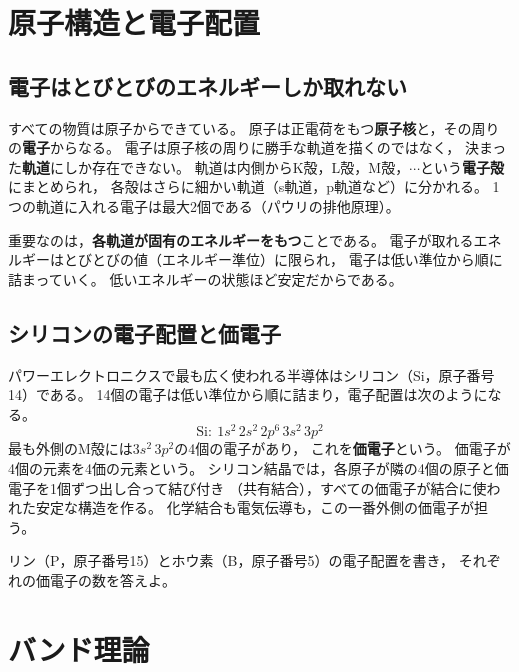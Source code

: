 \section{原子構造と電子配置}
\label{sec1.2}

\subsection{電子はとびとびのエネルギーしか取れない}

すべての物質は原子からできている。
原子は正電荷をもつ\textbf{原子核}と，その周りの\textbf{電子}からなる。
電子は原子核の周りに勝手な軌道を描くのではなく，
決まった\textbf{軌道}にしか存在できない。
軌道は内側からK殻，L殻，M殻，$\cdots$という\textbf{電子殻}にまとめられ，
各殻はさらに細かい軌道（s軌道，p軌道など）に分かれる。
1つの軌道に入れる電子は最大2個である（パウリの排他原理）。

重要なのは，\textbf{各軌道が固有のエネルギーをもつ}ことである。
電子が取れるエネルギーはとびとびの値（エネルギー準位）に限られ，
電子は低い準位から順に詰まっていく。
低いエネルギーの状態ほど安定だからである。

\subsection{シリコンの電子配置と価電子}

パワーエレクトロニクスで最も広く使われる半導体はシリコン（Si，原子番号14）である。
14個の電子は低い準位から順に詰まり，電子配置は次のようになる。
\begin{equation*}
\mathrm{Si:}\ 1s^2\,2s^2\,2p^6\,3s^2\,3p^2
\end{equation*}
最も外側のM殻には$3s^2\,3p^2$の4個の電子があり，
これを\textbf{価電子}という。
価電子が4個の元素を4価の元素という。
シリコン結晶では，各原子が隣の4個の原子と価電子を1個ずつ出し合って結び付き
（共有結合），すべての価電子が結合に使われた安定な構造を作る。
化学結合も電気伝導も，この一番外側の価電子が担う。

\begin{問}
\item リン（P，原子番号15）とホウ素（B，原子番号5）の電子配置を書き，
それぞれの価電子の数を答えよ。
\end{問}

\section{バンド理論}
\label{sec1.3}


